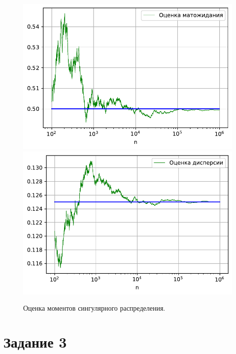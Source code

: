 \documentclass[16pt]{article}
\begin{document}
\begin{figure}[h]
	\center
    \includegraphics[scale=0.5]{2_2.pdf}
    \hfill
    \includegraphics[scale=0.5]{2_3.pdf}
    \caption{Оценка моментов сингулярного распределения.}
\end{figure}


\section{Задание 3}
\end{document}
